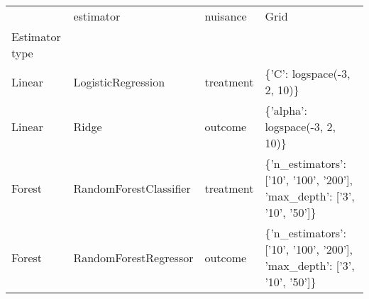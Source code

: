 \begin{tabular}{llll}
    \toprule
    {}             & estimator              & nuisance  & Grid                                                                       \\
    Estimator type &                        &           &                                                                            \\
    \midrule
    Linear         & LogisticRegression     & treatment & \{'C': logspace(-3, 2, 10)\}                                               \\
    Linear         & Ridge                  & outcome   & \{'alpha': logspace(-3, 2, 10)\}                                           \\
    Forest         & RandomForestClassifier & treatment & \{'n\_estimators': ['10', '100', '200'], 'max\_depth': ['3', '10', '50']\} \\
    Forest         & RandomForestRegressor  & outcome   & \{'n\_estimators': ['10', '100', '200'], 'max\_depth': ['3', '10', '50']\} \\
    \bottomrule
\end{tabular}
